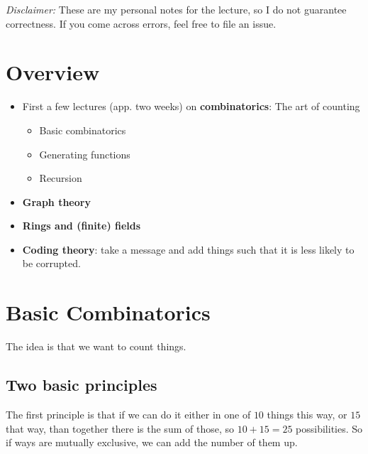 \documentclass[english]{lbscript}
\begin{document}


\tableofcontents{}

\vfill

\emph{Disclaimer:} These are my personal notes for the lecture, so I do not guarantee correctness. If you come across errors, feel free to file an issue.

\pagebreak


\section{Overview}
\label{sec:overview}

\begin{itemize}
  \item  First a few lectures (app. two weeks) on \textbf{combinatorics}: The art of counting
        \begin{itemize}
          \item Basic combinatorics
          \item Generating functions
          \item Recursion
        \end{itemize}
  \item \textbf{Graph theory} %
  \item \textbf{Rings and (finite) fields}
  \item \textbf{Coding theory}: take a message and add things such that it is less likely to be corrupted.
\end{itemize}


\section{Basic Combinatorics}
\label{sec:basic-combinatorics}

The idea is that we want to count things.

\subsection{Two basic principles}
\label{sec:two-basic-principles}


The first principle is that if we can do it either in one of \(10\) things this way, or \(15\) that way, than together there is the sum of those, so \(10+15=25\) possibilities. So if ways are mutually exclusive, we can add the number of them up.
\end{document}
